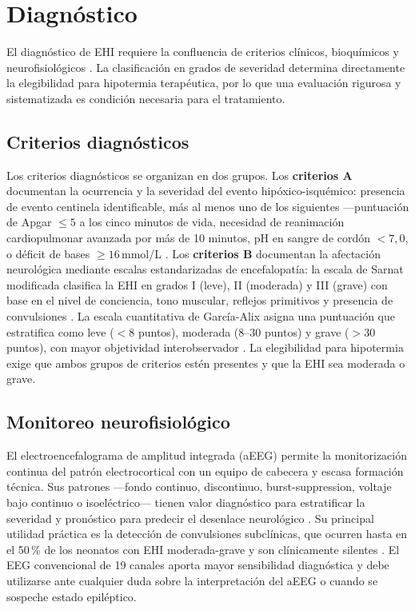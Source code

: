 \documentclass[12pt]{article}
\begin{document}
\section{Diagnóstico}
\label{sec:diagnostico}

El diagnóstico de EHI requiere la confluencia de criterios clínicos, bioquímicos y
neurofisiológicos \parencite{alsepneo2021}. La clasificación en grados de severidad
determina directamente la elegibilidad para hipotermia terapéutica, por lo que una
evaluación rigurosa y sistematizada es condición necesaria para el tratamiento.

\subsection{Criterios diagnósticos}
\label{subsec:criterios}

Los criterios diagnósticos se organizan en dos grupos. Los \textbf{criterios A}
documentan la ocurrencia y la severidad del evento hipóxico-isquémico: presencia de
evento centinela identificable, más al menos uno de los siguientes ---puntuación de
Apgar $\leq 5$ a los cinco minutos de vida, necesidad de reanimación cardiopulmonar
avanzada por más de 10 minutos, pH en sangre de cordón $< 7{,}0$, o déficit de
bases $\geq 16$\,mmol/L \parencite{sarnat1976}. Los \textbf{criterios B} documentan
la afectación neurológica mediante escalas estandarizadas de encefalopatía: la escala
de Sarnat modificada clasifica la EHI en grados I (leve), II (moderada) y III (grave)
con base en el nivel de conciencia, tono muscular, reflejos primitivos y presencia de
convulsiones \parencite{sarnat1976}. La escala cuantitativa de García-Alix asigna una
puntuación que estratifica como leve ($< 8$ puntos), moderada (8--30 puntos) y grave
($> 30$ puntos), con mayor objetividad interobservador \parencite{garciaalix2012}.
La elegibilidad para hipotermia exige que ambos grupos de criterios estén presentes y
que la EHI sea moderada o grave.

\subsection{Monitoreo neurofisiológico}
\label{subsec:eeg}

El electroencefalograma de amplitud integrada (aEEG) permite la monitorización
continua del patrón electrocortical con un equipo de cabecera y escasa formación
técnica. Sus patrones ---fondo continuo, discontinuo, burst-suppression, voltaje bajo
continuo o isoeléctrico--- tienen valor diagnóstico para estratificar la severidad y
pronóstico para predecir el desenlace neurológico \parencite{alsepneo2021}. Su
principal utilidad práctica es la detección de convulsiones subclínicas, que ocurren
hasta en el 50\,\% de los neonatos con EHI moderada-grave y son clínicamente silentes
\parencite{volpe2012}. El EEG convencional de 19 canales aporta mayor sensibilidad
diagnóstica y debe utilizarse ante cualquier duda sobre la interpretación del aEEG o
cuando se sospeche estado epiléptico.
\end{document}
